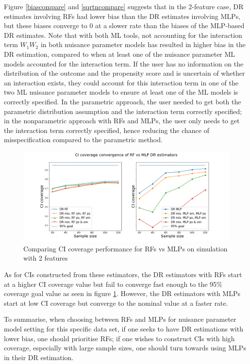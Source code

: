 \documentclass[12pt,twoside]{article}
\begin{document}
Figure \ref{biascompare} and \ref{sqrtncompare} suggests that in the 2-feature case, DR estimates involving RFs had lower bias than the DR estimates involving MLPs, but these biases converge to 0 at a slower rate than the biases of the MLP-based DR estimates. Note that with both ML tools, not accounting for the interaction term $W_1W_2$ in both nuisance parameter models has resulted in higher bias in the DR estimation, compared to when at least one of the nuisance parameter ML models accounted for the interaction term. If the user has no information on the distribution of the outcome and the propensity score and is uncertain of whether an interaction exists, they could account for this interaction term in one of the two ML nuisance parameter models to ensure at least one of the ML models is correctly specified. In the parametric approach, the user needed to get both the parametric distribution assumption and the interaction term correctly specified; in the nonparametric approach with RFs and MLPs, the user only needs to get the interaction term correctly specified, hence reducing the chance of misspecification compared to the parametric method.

\begin{figure}[h!]
    \centering
    \includegraphics[width = 0.9\columnwidth]{figures/CIcompare.png}
    \caption{Comparing CI coverage performance for RFs vs MLPs on simulation with 2 features}
    \label{CIcompare}
\end{figure}
 
As for CIs constructed from these estimators, the DR estimators with RFs start at a higher CI coverage value but fail to converge fast enough to the 95\% coverage goal value as seen in figure \ref{CIcompare}. However, the DR estimators with MLPs start at low CI coverage but converge to the nominal value at a faster rate.

To summarise, when choosing between RFs and MLPs for nuisance parameter model setting for this specific data set, if one seeks to have DR estimations with lower bias, one should prioritise RFs; if one wishes to construct CIs with high coverage, especially with large sample sizes, one should turn towards using MLPs in their DR estimation.
\end{document}
